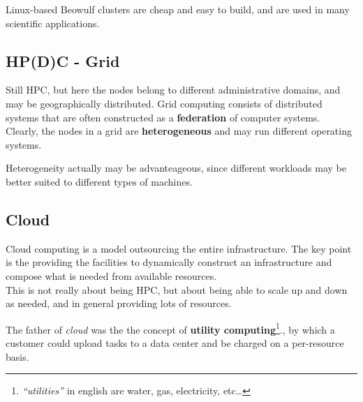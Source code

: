 {Linux-based Beowulf clusters are cheap and easy to build, and are used in many scientific applications.}

\subsection{HP(D)C - Grid}
Still HPC, but here the nodes belong to different administrative domains, and may be geographically distributed.
Grid computing consists of distributed systems that are often constructed as a \textbf{federation} of computer systems.\\
Clearly, the nodes in a grid are \textbf{heterogeneous} and may run different operating systems.

Heterogeneity actually may be advanteageous, since different workloads may be better suited to different types of machines.



\subsection{Cloud}

Cloud computing is a model outsourcing the entire infrastructure.
The key point is the providing the facilities to dynamically construct an infrastructure and compose what is needed from available resources.\\
This is not really about being HPC, but about being able to scale up and down as needed, and in general providing lots of resources.

The father of \textit{cloud} was the the concept of \textbf{utility computing}\footnote{\textit{``utilities''} in english are water, gas, electricity, etc\dots}., by which a customer could upload tasks to a data center and be charged on
a per-resource basis.


